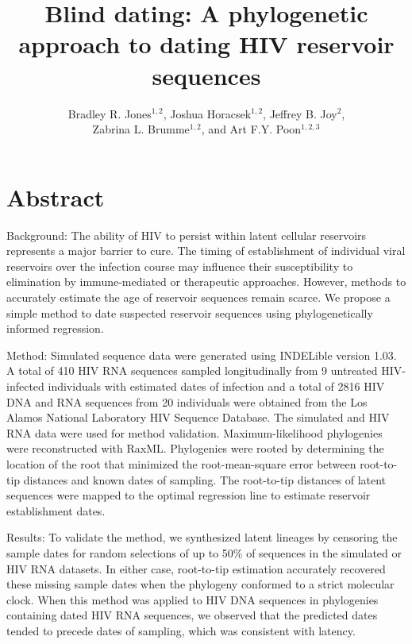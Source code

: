 \documentclass[12pt]{article}
\begin{document}
\title{Blind dating: A phylogenetic approach to dating HIV reservoir sequences}

\author{Bradley R. Jones$^{1,2}$, Joshua Horacsek$^{1,2}$, Jeffrey B. Joy$^2$, \\ Zabrina L. Brumme$^{1,2}$, and Art F.Y. Poon$^{1,2,3}$}
\baselineskip 22pt
\pagewiselinenumbers

\date{}
\maketitle

\section * {Abstract}

Background: 
The ability of HIV to persist within latent cellular reservoirs represents a major barrier to cure.
The timing of establishment of individual viral reservoirs over the infection course may influence their susceptibility to elimination by immune-mediated or therapeutic approaches.
However, methods to accurately estimate the age of reservoir sequences remain scarce.
We propose a simple method to date suspected reservoir sequences using phylogenetically informed regression.

Method: 
Simulated sequence data were generated using INDELible version 1.03.
A total of 410 HIV RNA sequences sampled longitudinally from 9 untreated HIV-infected individuals with estimated dates of infection and a total of 2816 HIV DNA and RNA sequences from 20 individuals were obtained from the Los Alamos National Laboratory HIV Sequence Database.
The simulated and HIV RNA data were used for method validation. Maximum-likelihood phylogenies were reconstructed with RaxML.
Phylogenies were rooted by determining the location of the root that minimized the root-mean-square error between root-to-tip distances and known dates of sampling. The root-to-tip distances of latent sequences were mapped to the optimal regression line to estimate reservoir establishment dates.

Results: 
To validate the method, we synthesized latent lineages by censoring the sample dates for random selections of up to 50\% of sequences in the simulated or HIV RNA datasets.
In either case, root-to-tip estimation accurately recovered these missing sample dates when the phylogeny conformed to a strict molecular clock.
When this method was applied to HIV DNA sequences in phylogenies containing dated HIV RNA sequences, we observed that the predicted dates tended to precede dates of sampling, which was consistent with latency.
\end{document}
